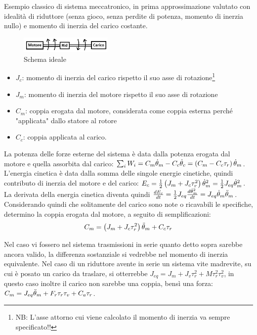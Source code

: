 Esempio classico di sistema meccatronico, in prima approssimazione valutato con idealità di riduttore (senza gioco, senza perdite di potenza, momento di inerzia nullo) e momento di inerzia del carico costante.

\begin{figure}[h]
    \centering
    \includegraphics[width=0.4\textwidth]{Immagini/motoreriduttorecarico_id.png}
    \caption{Schema ideale}
\end{figure}


\begin{itemize}
    \item $J_c$: momento di inerzia del carico rispetto il suo asse di rotazione\footnote{NB: L'asse attorno cui viene calcolato il momento di inerzia va sempre specificato!!}
    \item $J_m$: momento di inerzia del motore rispetto il suo asse di rotazione
    \item $C_m$: coppia erogata dal motore, considerata come coppia esterna perché "applicata" dallo statore al rotore
    \item $C_c$: coppia applicata al carico.
\end{itemize}

La potenza delle forze esterne del sistema è data dalla potenza erogata dal motore e quella assorbita dal carico: $\sum_i W_i=C_m \dot{\theta}_m -C_c \dot{\theta}_c=\left(C_m -C_c \tau_r\right)\dot{\theta}_m$. L'energia cinetica è data dalla somma delle singole energie cinetiche, quindi contributo di inerzia del motore e del carico: $E_c=\frac{1}{2} \left(J_m + J_c\tau_r^2 \right)\dot{\theta}_m^2=\frac{1}{2} J_{eq} \dot{\theta}_m^2$.
La derivata della energia cinetica diventa quindi $\frac{dE_c}{dt}=\frac{1}{2} J_{eq}\frac{d\dot{\theta}_m^2}{dt}=J_{eq}\dot{\theta}_m \Ddot{\theta}_m$.
Considerando quindi che solitamente del carico sono note o ricavabili le specifiche, determino la coppia erogata dal motore, a seguito di semplificazioni: \[C_m=\left(J_m+J_c\tau_r^2\right)\Ddot{\theta}_m+C_c\tau_r\]

Nel caso vi fossero nel sistema trasmissioni in serie quanto detto sopra sarebbe ancora valido, la differenza sostanziale si vedrebbe nel momento di inerzia equivalente.
Nel caso di un riduttore avente in serie un sistema vite madrevite, su cui è posato un carico da traslare, si otterrebbe $J_{eq}=J_m+J_v \tau^2_r + M \tau_r^2 \tau_v^2$, in questo caso inoltre il carico non sarebbe una coppia, bensì una forza: $C_m=J_{eq}\Ddot{\theta}_m + F_r \tau_r \tau_v + C_a \tau_r$. \label{TrasmissioneSerie}

